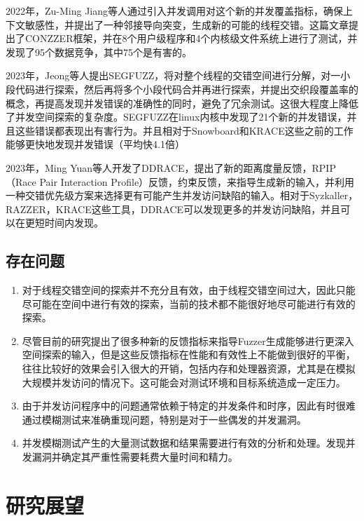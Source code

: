2022年，Zu-Ming Jiang\cite{jiang2022context}等人通过引入并发调用对这个新的并发覆盖指标，确保上下文敏感性，并提出了一种邻接导向突变，生成新的可能的线程交错。这篇文章提出了CONZZER框架，并在8个用户级程序和4个内核级文件系统上进行了测试，并发现了95个数据竞争，其中75个是有害的。

2023年，Jeong等人提出SEGFUZZ\cite{jeong2023segfuzz}，将对整个线程的交错空间进行分解，对一小段代码进行探索，然后再将多个小段代码合并再进行探索，并提出交织段覆盖率的概念，再提高发现并发错误的准确性的同时，避免了冗余测试。这很大程度上降低了并发空间探索的复杂度。SEGFUZZ在linux内核中发现了21个新的并发错误，并且这些错误都表现出有害行为。并且相对于Snowboard和KRACE这些之前的工作能够更快地发现并发错误（平均快4.1倍）

2023年，Ming Yuan等人开发了DDRACE\cite{yuan2023ddrace}，提出了新的距离度量反馈，RPIP（Race Pair Interaction Profile）反馈，约束反馈，来指导生成新的输入，并利用一种交错优先级方案来选择更有可能产生并发访问缺陷的输入。相对于Syzkaller，RAZZER，KRACE这些工具，DDRACE可以发现更多的并发访问缺陷，并且可以在更短时间内发现。

\subsection{存在问题}

\begin{enumerate}
\item 对于线程交错空间的探索并不充分且有效，由于线程交错空间过大，因此只能尽可能在空间中进行有效的探索，当前的技术都不能很好地尽可能进行有效的探索。
\item 尽管目前的研究提出了很多种新的反馈指标来指导Fuzzer生成能够进行更深入空间探索的输入，但是这些反馈指标在性能和有效性上不能做到很好的平衡，往往比较好的效果会引入很大的开销，包括内存和处理器资源，尤其是在模拟大规模并发访问的情况下。这可能会对测试环境和目标系统造成一定压力。
\item 由于并发访问程序中的问题通常依赖于特定的并发条件和时序，因此有时很难通过模糊测试来准确重现问题，特别是对于一些偶发的并发漏洞。
\item 并发模糊测试产生的大量测试数据和结果需要进行有效的分析和处理。发现并发漏洞并确定其严重性需要耗费大量时间和精力。
\end{enumerate}

\section{研究展望}

